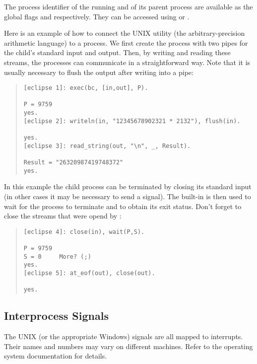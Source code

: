 The process identifier of the running {\eclipse} and of its parent process are
available as the global flags
and
respectively.
They can be accessed using
 or
.

Here is an example of how to connect the UNIX utility  (the
arbitrary-precision arithmetic language) to a {\eclipse} process.
We first create the process with two pipes for the child's standard input
and output.
Then, by writing and reading these streams, the processes can communicate in
a straightforward way. Note that it is usually necessary to flush the
output after writing into a pipe:
\begin{quote}
\begin{verbatim}
[eclipse 1]: exec(bc, [in,out], P).

P = 9759
yes.
[eclipse 2]: writeln(in, "12345678902321 * 2132"), flush(in).

yes.
[eclipse 3]: read_string(out, "\n", _, Result).

Result = "26320987419748372"
yes.
\end{verbatim}
\end{quote}
In this example the child process can be terminated by closing its standard
input (in other cases it may be necessary to send a signal).
The built-in  is then used to
wait for the process to terminate
and to obtain its exit status.
Don't forget to close the {\eclipse} streams that were opend by
:
\begin{quote}
\begin{verbatim}
[eclipse 4]: close(in), wait(P,S).

P = 9759
S = 0     More? (;)
yes.
[eclipse 5]: at_eof(out), close(out).

yes.
\end{verbatim}
\end{quote}

\subsection{Interprocess Signals}
The UNIX (or the appropriate Windows) signals are all mapped to {\eclipse}
interrupts.
Their names and numbers may vary on different machines.
Refer to the operating system documentation for details.

